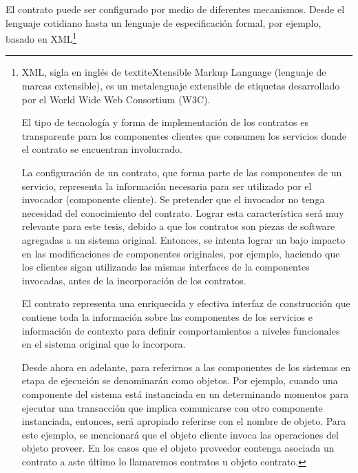 El contrato puede ser configurado por medio de diferentes mecanismos. Desde el lenguaje cotidiano hasta un lenguaje de especificación formal, por ejemplo, basado en XML\footnote {XML, sigla en inglés de textit{eXtensible Markup Language} (lenguaje de marcas extensible), es un metalenguaje extensible de etiquetas desarrollado por el World Wide Web Consortium (W3C). 

El tipo de tecnología y forma de implementación de los contratos es transparente para los componentes clientes que consumen los servicios donde el contrato se encuentran involucrado.

La configuración de un contrato, que forma parte de las componentes de un servicio, representa la información necesaria  para ser utilizado por el invocador (componente cliente). Se pretender que el invocador no tenga necesidad del conocimiento del contrato. Lograr esta característica será muy relevante para este tesis, debido a que los contratos son piezas de software agregadas a un sistema original. Entonces, se intenta lograr un bajo impacto en las modificaciones de componentes originales, por ejemplo, haciendo que los clientes sigan utilizando las mismas interfaces de la componentes invocadas, antes de la incorporación de los contratos. 

El contrato representa una enriquecida y efectiva interfaz de construcción que contiene toda la información sobre las componentes de los servicios e información de contexto para definir comportamientos a niveles funcionales en el sistema original que lo incorpora.

Desde ahora en adelante, para referirnos a las componentes de los sistemas en etapa de ejecución se denominarán como objetos. Por ejemplo, cuando una componente del sistema está instanciada en un determinando momentos para ejecutar una transacción que implica comunicarse con otro componente instanciada, entonces, será apropiado referirse con el nombre de objeto. Para este ejemplo, se mencionará que el objeto cliente invoca las operaciones del objeto proveer. En los casos que el objeto proveedor contenga asociada un contrato a aste último lo llamaremos contratos u objeto contrato.


}
